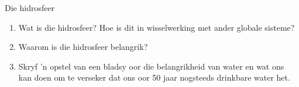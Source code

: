\begin{eocexercises}{Die hidrosfeer}
            \nopagebreak

\begin{enumerate}[noitemsep, label=\textbf{\arabic*}. ] 
    \item Wat is die hidrosfeer? Hoe is dit in wisselwerking met ander globale sisteme?
    \item Waarom is die hidrosfeer belangrik?
    \item Skryf  'n opstel van een bladsy oor die belangrikheid van water en wat ons kan doen om te verseker dat ons oor 50 jaar nogsteeds drinkbare water het.
\end{enumerate}

\end{eocexercises}
